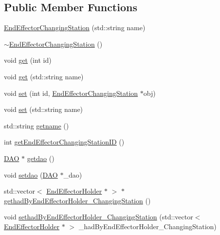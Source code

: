 \subsection*{Public Member Functions}
\begin{DoxyCompactItemize}
\item 
\hyperlink{class_end_effector_changing_station_a4e7cf79b0c4a95c929c087751a6da64b}{EndEffectorChangingStation} (std::string name)
\item 
\hyperlink{class_end_effector_changing_station_aaafbda57e9a6adb66be19ddb392ae1c3}{$\sim$EndEffectorChangingStation} ()
\item 
void \hyperlink{class_end_effector_changing_station_a6e81c29409f7fd3d37d170c949541b8b}{get} (int id)
\item 
void \hyperlink{class_end_effector_changing_station_a74afe5e584a48413753dec5415f33773}{get} (std::string name)
\item 
void \hyperlink{class_end_effector_changing_station_af65ae5766112791822d3e401c5571edc}{set} (int id, \hyperlink{class_end_effector_changing_station}{EndEffectorChangingStation} $\ast$obj)
\item 
void \hyperlink{class_end_effector_changing_station_a98fbf0908d853314f7486ccedcc62f16}{set} (std::string name)
\item 
std::string \hyperlink{class_end_effector_changing_station_a84a3564d9a1ce4edb2920e5656aa8ee5}{getname} ()
\item 
int \hyperlink{class_end_effector_changing_station_aeb2a6f68d6d42e15216db9fc88864da1}{getEndEffectorChangingStationID} ()
\item 
\hyperlink{class_d_a_o}{DAO} $\ast$ \hyperlink{class_end_effector_changing_station_a1c3a82945ca51ae62fdc1b6362e4eaaa}{getdao} ()
\item 
void \hyperlink{class_end_effector_changing_station_a4f7cdd05e0180363752179dd33ce552c}{setdao} (\hyperlink{class_d_a_o}{DAO} $\ast$\_\-dao)
\item 
std::vector$<$ \hyperlink{class_end_effector_holder}{EndEffectorHolder} $\ast$ $>$ $\ast$ \hyperlink{class_end_effector_changing_station_af9ec9dddd389cb38481da7f9a2755000}{gethadByEndEffectorHolder\_\-ChangingStation} ()
\item 
void \hyperlink{class_end_effector_changing_station_ae8ff696c52eb222d24d83ebf45c70a9b}{sethadByEndEffectorHolder\_\-ChangingStation} (std::vector$<$ \hyperlink{class_end_effector_holder}{EndEffectorHolder} $\ast$ $>$ \_\-hadByEndEffectorHolder\_\-ChangingStation)
\item 

\end{DoxyCompactItemize}
